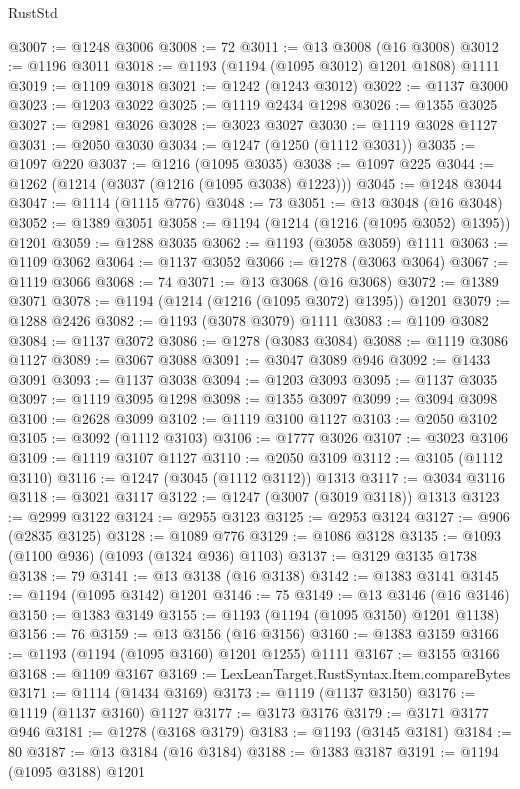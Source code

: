 \begin{lexlean}{RustStd}
\begin{coremodule}
@3007 := @1248 @3006
@3008 := 72
@3011 := @13 @3008 (@16 @3008)
@3012 := @1196 @3011
@3018 := @1193 (@1194 (@1095 @3012) @1201 @1808) @1111
@3019 := @1109 @3018
@3021 := @1242 (@1243 @3012)
@3022 := @1137 @3000
@3023 := @1203 @3022
@3025 := @1119 @2434 @1298
@3026 := @1355 @3025
@3027 := @2981 @3026
@3028 := @3023 @3027
@3030 := @1119 @3028 @1127
@3031 := @2050 @3030
@3034 := @1247 (@1250 (@1112 @3031))
@3035 := @1097 @220
@3037 := @1216 (@1095 @3035)
@3038 := @1097 @225
@3044 := @1262 (@1214 (@3037 (@1216 (@1095 @3038) @1223)))
@3045 := @1248 @3044
@3047 := @1114 (@1115 @776)
@3048 := 73
@3051 := @13 @3048 (@16 @3048)
@3052 := @1389 @3051
@3058 := @1194 (@1214 (@1216 (@1095 @3052) @1395)) @1201
@3059 := @1288 @3035
@3062 := @1193 (@3058 @3059) @1111
@3063 := @1109 @3062
@3064 := @1137 @3052
@3066 := @1278 (@3063 @3064)
@3067 := @1119 @3066
@3068 := 74
@3071 := @13 @3068 (@16 @3068)
@3072 := @1389 @3071
@3078 := @1194 (@1214 (@1216 (@1095 @3072) @1395)) @1201
@3079 := @1288 @2426
@3082 := @1193 (@3078 @3079) @1111
@3083 := @1109 @3082
@3084 := @1137 @3072
@3086 := @1278 (@3083 @3084)
@3088 := @1119 @3086 @1127
@3089 := @3067 @3088
@3091 := @3047 @3089 @946
@3092 := @1433 @3091
@3093 := @1137 @3038
@3094 := @1203 @3093
@3095 := @1137 @3035
@3097 := @1119 @3095 @1298
@3098 := @1355 @3097
@3099 := @3094 @3098
@3100 := @2628 @3099
@3102 := @1119 @3100 @1127
@3103 := @2050 @3102
@3105 := @3092 (@1112 @3103)
@3106 := @1777 @3026
@3107 := @3023 @3106
@3109 := @1119 @3107 @1127
@3110 := @2050 @3109
@3112 := @3105 (@1112 @3110)
@3116 := @1247 (@3045 (@1112 @3112)) @1313
@3117 := @3034 @3116
@3118 := @3021 @3117
@3122 := @1247 (@3007 (@3019 @3118)) @1313
@3123 := @2999 @3122
@3124 := @2955 @3123
@3125 := @2953 @3124
@3127 := @906 (@2835 @3125)
@3128 := @1089 @776
@3129 := @1086 @3128
@3135 := @1093 (@1100 @936) (@1093 (@1324 @936) @1103)
@3137 := @3129 @3135 @1738
@3138 := 79
@3141 := @13 @3138 (@16 @3138)
@3142 := @1383 @3141
@3145 := @1194 (@1095 @3142) @1201
@3146 := 75
@3149 := @13 @3146 (@16 @3146)
@3150 := @1383 @3149
@3155 := @1193 (@1194 (@1095 @3150) @1201 @1138)
@3156 := 76
@3159 := @13 @3156 (@16 @3156)
@3160 := @1383 @3159
@3166 := @1193 (@1194 (@1095 @3160) @1201 @1255) @1111
@3167 := @3155 @3166
@3168 := @1109 @3167
@3169 := LexLeanTarget.RustSyntax.Item.compareBytes
@3171 := @1114 (@1434 @3169)
@3173 := @1119 (@1137 @3150)
@3176 := @1119 (@1137 @3160) @1127
@3177 := @3173 @3176
@3179 := @3171 @3177 @946
@3181 := @1278 (@3168 @3179)
@3183 := @1193 (@3145 @3181)
@3184 := 80
@3187 := @13 @3184 (@16 @3184)
@3188 := @1383 @3187
@3191 := @1194 (@1095 @3188) @1201

\end{coremodule}
\end{lexlean}
